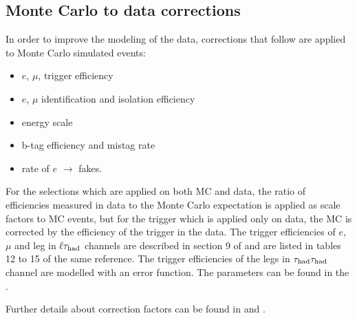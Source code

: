 \subsection{Monte Carlo to data corrections}
\label{sec:scaleFactors}
In order to improve the modeling of the data, corrections that follow are
 applied  to Monte Carlo simulated events:
\begin{itemize}
\item $e$, $\mu$, \Tau trigger efficiency
\item $e$, $\mu$ identification and isolation efficiency
\item \Tau energy scale
\item b-tag efficiency and mistag rate
\item rate of $e$ $\rightarrow$ \Tau  fakes.
\end{itemize}
For the selections which are applied on both MC and data, the ratio of efficiencies measured in data to the Monte Carlo expectation is applied as scale factors to MC events, but for the trigger which is applied only on data, the MC is corrected by the efficiency of the trigger in the data.
The trigger efficiencies of $e$, $\mu$ and \Tau leg in $\ell\tau_{\rm had}$ channels are described in section 9 of \cite{CMS_AN_2013-171}  and are listed in 
tables 12 to 15 of the same reference. The trigger efficiencies of the \Tau legs in $\tau_{\rm had}\tau_{\rm had}$ channel are modelled with an error function. 
The parameters can be found in the \cite{HiggsTauTautwiki}.
 
Further details about correction factors can be found  in   \cite{HiggsTauTautwiki} and  \cite{CMS_AN_2013-171}.


 
